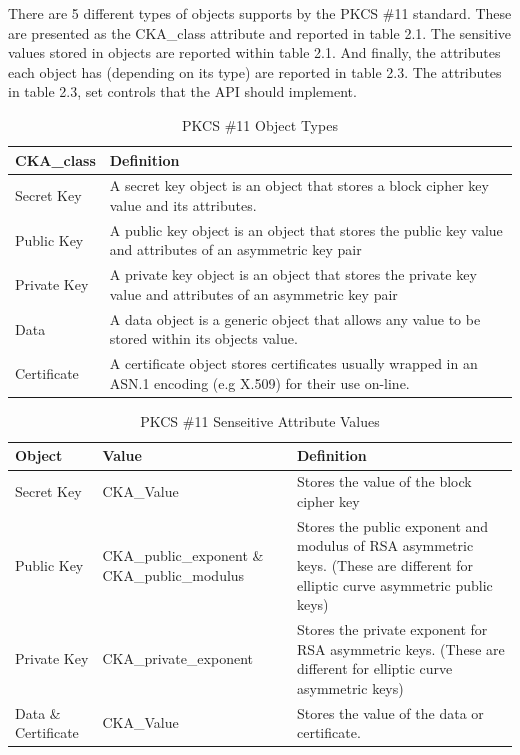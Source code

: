 \documentclass[bsc,frontabs,twoside,singlespacing,parskip,deptreport]{infthesis}     %
\begin{document}
There are 5 different types of objects supports by the PKCS \#11 standard. These are presented as the CKA\_class attribute and reported in table 2.1. The sensitive values stored in objects are reported within table 2.1. And finally, the attributes each object has (depending on its type) are reported in table 2.3. The attributes in table 2.3, set controls that the API should implement.

\begin{table}[H]
\begin{tabular}{|l|p{10cm}|}
\hline 
CKA\_class & Definition\\
\hline
Secret Key & A secret key object is an object that stores a block cipher key value and its attributes.\\
\hline
Public Key & A public key object is an object that stores the public key value and attributes of an asymmetric key pair\\
\hline
Private Key & A private key object is an object that stores the private key value and attributes of an asymmetric key pair\\
\hline
Data & A data object is a generic object that allows any value to be stored within its objects value.\\
\hline
Certificate & A certificate object stores certificates usually wrapped in an ASN.1 encoding (e.g X.509) for their use on-line.\\
\hline
\end{tabular}
\caption{PKCS \#11 Object Types}
\end{table}

\begin{table}[H]
\hskip-1.5cm\begin{tabular}{|p{3cm}|p{5cm}|p{10cm}|}
\hline
Object & Value & Definition\\
\hline
Secret Key & CKA\_Value & Stores the value of the block cipher key\\
\hline
Public Key & CKA\_public\_exponent \& CKA\_public\_modulus & Stores the public exponent and modulus of RSA asymmetric keys. (These are different for elliptic curve asymmetric public keys)\\
\hline
Private Key & CKA\_private\_exponent & Stores the private exponent for RSA asymmetric keys. (These are different for elliptic curve asymmetric keys)\\
\hline
Data \& Certificate & CKA\_Value & Stores the value of the data or certificate.\\
\hline
\end{tabular}
\caption{PKCS \#11 Senseitive Attribute Values}
\end{table}
\end{document}
